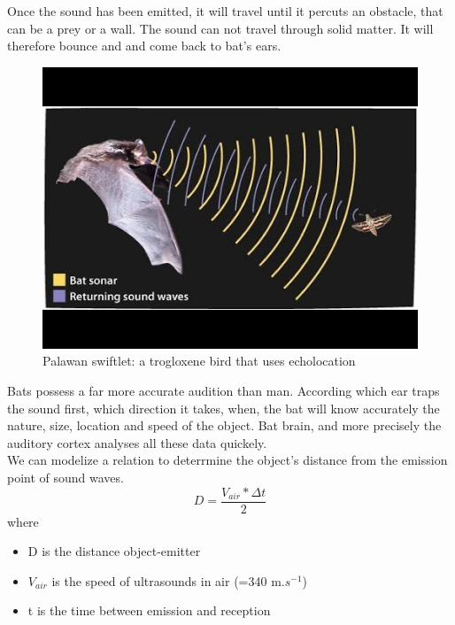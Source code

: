 \documentclass[draft, final]{report}
\begin{document}
\clearpage
Once the sound has been emitted, it will travel until it percuts an obstacle, that can be a prey or a wall. The sound can not travel through solid matter. It will therefore bounce and and come back to bat’s ears.\\
\newline
\begin{figure}[!ht]
  \centering
  \includegraphics[scale=0.5]{LateX/Images/echolocation.png}
  \caption{Palawan swiftlet: a trogloxene bird that uses echolocation\cite{batecholocation}}
\end{figure}

Bats possess a far more accurate audition than man. According which ear traps the sound first, which direction it takes, when, the bat will know accurately the nature, size, location and speed of
the object. Bat brain, and more precisely the auditory cortex analyses all these data quickely.\\

We can modelize a relation to deterrmine the object’s distance from the emission point of sound waves.\\
\newline
\begin{equation}
  D = \frac{V_{air}*\Delta t}{2}
\end{equation}
\newline
where
\begin{itemize}
  \item D is the distance object-emitter
  \item $V_{air}$ is the speed of ultrasounds in air (=340 m.$s^{-1}$)
  \item \Delta t is the time between emission and reception
\end{itemize}
\end{document}
